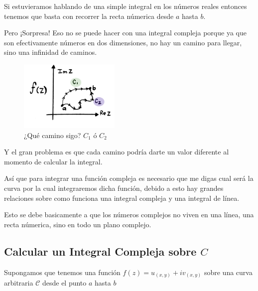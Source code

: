 \documentclass[12pt, fleqn]{report}                             %
\begin{document}
            Si estuvieramos hablando de una simple integral en los números reales entonces
            tenemos que basta con recorrer la recta númerica desde $a$ hasta $b$.

            Pero ¡Sorpresa! Eso no se puede hacer con una integral compleja porque ya que son
            efectivamente números en dos dimensiones, no hay un camino para llegar, sino
            una infinidad de caminos.

            \begin{figure}
                \centering
                \includegraphics[width=0.43\textwidth]{CaminosDeIntegralCompleja.jpg}
                \caption{\scriptsize{¿Qué camino sigo? $C_1$ ó $C_2$}}
            \end{figure}

            Y el gran problema es que cada camino podría darte un valor diferente
            al momento de calcular la integral.

            Así que para integrar una función compleja es necesario que me digas
            cual será la curva por la cual integraremos dicha función, debido a esto
            hay grandes relaciones sobre como funciona una integral compleja y una 
            integral de línea.

            Esto se debe basicamente a que los números complejos no viven en una línea, 
            una recta númerica, sino en todo un plano complejo.


            \clearpage
            \subsection{Calcular un Integral Compleja sobre $C$}


                Supongamos que tenemos una función $f(z) = u_{(x,y)} + iv_{(x,y)}$
                sobre una curva arbitraria $\mathcal{C}$ desde el punto $a$ hasta $b$
\end{document}
